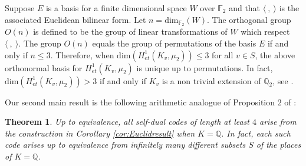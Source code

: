 \documentclass[noams]{compositio}
\newtheorem{thm}{Theorem}[section] %
\theoremstyle{definition} %
\theoremstyle{remark} %
\newcommand{\F}{\mathbb{F}}
\newcommand{\Q}{\mathbb{Q}}
\begin{document}
Suppose $E$ is a basis for a finite dimensional space $W$ over $\F_2$ and that $\langle \ , \ \rangle$ is the associated
Euclidean bilinear form.  Let $n = \mathrm{dim}_{\F_2}(W)$.  The orthogonal group $O(n)$ is defined to be the group of linear transformations of $W$ 
which respect $\langle \ , \ \rangle$.  %
The group $O(n)$ equals the group of permutations of the basis $E$ if and only
if $n \leq 3$.  Therefore, when $\mathrm{dim}(H^1_{et}(K_v,\mu_2)) \leq 3$ for all $v \in S$, the above orthonormal basis for $H^1_{et}(K_v, \mu_2)$ is unique up to permutations.  In fact, 
 $\mathrm{dim}(H^1_{et}(K_v,\mu_2)) > 3$ if and only if $K_v$ is a non trivial extension of $\Q_2$, see \cite[Proposition 5.7, Chap II]{Neukirch1999}.




Our second main result is the
following arithmetic analogue of Proposition 2 of \cite{Kreck2008}:

\begin{thm}
\label{thm:codedef}
 Up to equivalence, all self-dual codes of length
at least $4$ arise from the construction in Corollary \ref{cor:Euclidresult} when $K = \mathbb{Q}$.
In fact, each such code arises up to equivalence from infinitely many different subsets $S$
of the places of $K = \Q$.
 \end{thm}
\end{document}
